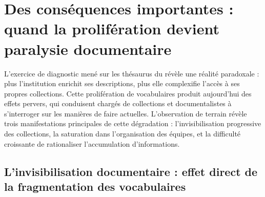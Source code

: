 \section{\label{II-A-2}Des conséquences importantes : quand la prolifération devient paralysie documentaire}

L'exercice de diagnostic mené sur les thésaurus du \mae révèle une réalité paradoxale : plus l'institution enrichit ses descriptions, plus elle complexifie l'accès à ses propres collections. Cette prolifération de vocabulaires produit aujourd'hui des effets pervers, qui conduisent chargés de collections et documentalistes à s'interroger sur les manières de faire actuelles. L'observation de terrain révèle trois manifestations principales de cette dégradation : l'invisibilisation progressive des collections, la saturation dans l'organisation des équipes, et la difficulté croissante de rationaliser l'accumulation d'informations.

\subsection{L'invisibilisation documentaire : effet direct de la fragmentation des vocabulaires}

